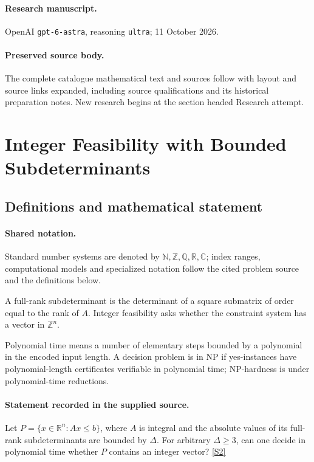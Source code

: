 \documentclass[11pt]{article}
\begin{document}
\paragraph{Research manuscript.} OpenAI \texttt{gpt-6-astra}, reasoning \texttt{ultra}; 11 October 2026.
\paragraph{Preserved source body.} The complete catalogue mathematical text and sources follow with layout and source links expanded, including source qualifications and its historical preparation notes. New research begins at the section headed Research attempt.

\section{Integer Feasibility with Bounded Subdeterminants}\label{statement}

\subsection{Definitions and mathematical statement}

\paragraph{Shared notation.}Standard number systems are denoted by $\mathbb N,\mathbb Z,\mathbb Q,\mathbb R,\mathbb C$; index ranges, computational models and specialized notation follow the cited problem source and the definitions below.


A full-rank subdeterminant is the determinant of a square submatrix of order equal to the rank of $A$. Integer feasibility asks whether the constraint system has a vector in $\mathbb Z^n$.

Polynomial time means a number of elementary steps bounded by a polynomial in the encoded input length. A decision problem is in $\mathrm{NP}$ if yes-instances have polynomial-length certificates verifiable in polynomial time; NP-hardness is under polynomial-time reductions.
\paragraph{Statement recorded in the supplied source.}
Let $P=\{x\in\mathbb R^n:Ax\leq b\}$, where $A$ is integral and the absolute values of its full-rank subdeterminants are bounded by $\Delta$. For arbitrary $\Delta\geq3$, can one decide in polynomial time whether $P$ contains an integer vector? \href{https://doi.org/10.4171/owr/2024/50}{[S2]}
\end{document}
